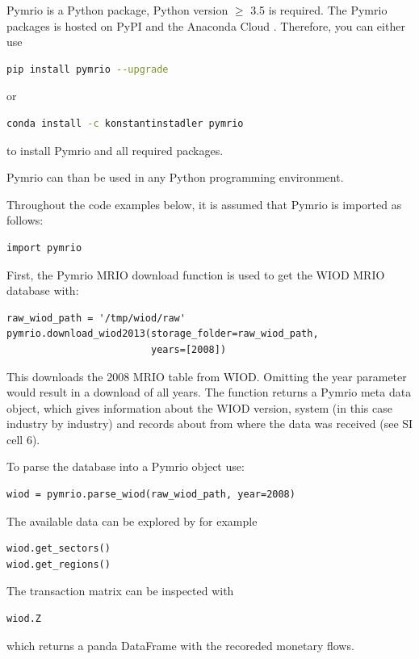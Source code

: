 \documentclass{jors}
\begin{document}
{Pymrio is a Python \cite{python2018} package, Python version  $\geq$ 3.5 is required.
The Pymrio packages is hosted on PyPI  \cite{pypi2018}  and the Anaconda Cloud \cite{anacondainc.2018}.
Therefore, you can either use
\begin{lstlisting}[language=Bash]
pip install pymrio --upgrade
\end{lstlisting}
or
\begin{lstlisting}[language=Bash]
conda install -c konstantinstadler pymrio
\end{lstlisting}

to install Pymrio and all required packages.

Pymrio can than be used in any Python programming environment.

Throughout the code examples below, it is assumed that Pymrio is imported as follows: 

\begin{lstlisting}
import pymrio
\end{lstlisting}

First, the Pymrio MRIO download function is used to get the WIOD MRIO database with:
\begin{lstlisting}
raw_wiod_path = '/tmp/wiod/raw'
pymrio.download_wiod2013(storage_folder=raw_wiod_path,
                         years=[2008])
\end{lstlisting}

This downloads the 2008 MRIO table from WIOD. Omitting the year parameter would result in a download of all years.
The function returns a Pymrio meta data object, which gives information about the WIOD version, system (in this case industry by industry) and records about from where the data was received (see SI cell 6).

To parse the database into a Pymrio object use:
\begin{lstlisting}
wiod = pymrio.parse_wiod(raw_wiod_path, year=2008)
\end{lstlisting}

The available data can be explored by for example
\begin{lstlisting}
wiod.get_sectors()
wiod.get_regions()
\end{lstlisting}

The transaction matrix can be inspected with
\begin{lstlisting}
wiod.Z
\end{lstlisting}

which returns a panda DataFrame with the recoreded monetary flows.

}
\end{document}

